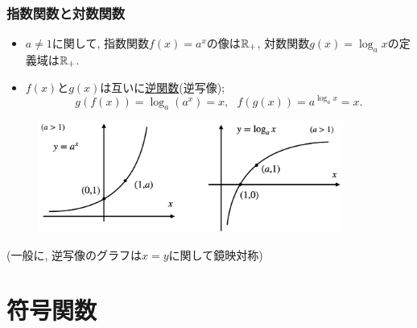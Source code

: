 \begin{frame}
\frametitle{指数関数と対数関数}   

\begin{itemize}
\item $a \ne 1$に関して, 指数関数$f(x)=a^x$の像は$\mathbb{R}_+$, 対数関数$g(x)=\log_ax$の定義域は$\mathbb{R}_+$. 
\item $f(x)$と$g(x)$は互いに\underline{逆関数}(逆写像);  
$$
g(f(x))=\log_a(a^x)=x, \ \ \ f(g(x))=a^{\log_ax}=x. 
$$
\end{itemize}

\vspace{-1mm}

\begin{figure}[htbp]
 \begin{center} 
  \includegraphics[width=100mm]{calculus2/exp_log.png}
 \end{center}
\end{figure}
\vspace{-4mm}

(一般に, 逆写像のグラフは$x=y$に関して鏡映対称)

\end{frame}



\section{符号関数}

